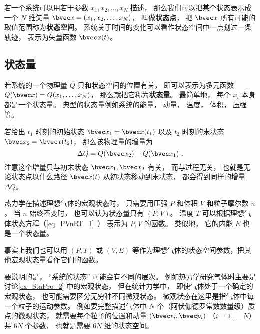 

若一个系统可以用若干参数 $x_1, x_2,  \dots, x_N$ 描述， 那么我们可以把某个状态表示成一个 $N$ 维矢量 $\bvec x = (x_1, x_2, \dots, x_N)$， 叫做\textbf{状态点}， 把 $\bvec x$ 所有可能的取值范围称为\textbf{状态空间}。 系统关于时间的变化可以看作状态空间中一点划过一条轨迹， 表示为矢量函数 $\bvec x(t)$。

\subsection{状态量}
若系统的一个物理量 $Q$ 只和状态空间的位置有关， 即可以表示为多元函数 $Q(\bvec x) = Q(x_1, \dots, x_N)$， 那么就把它称为\textbf{状态量}。 最简单地， 每个 $x_i$ 本身都是一个状态量。 典型的状态量例如系统的能量， 动量， 温度， 体积， 压强等。

若给出 $t_1$ 时刻的初始状态 $\bvec x_1 = \bvec x(t_1)$ 以及 $t_2$ 时刻的末状态 $\bvec x_2 = \bvec x(t_2)$， 那么该物理量的增量为
\begin{equation}
\Delta Q = Q(\bvec x_2) - Q(\bvec x_1)~.
\end{equation}
注意这个增量只与初末状态 $\bvec x_1,\bvec x_2$ 有关， 而与过程无关， 也就是无论状态点以什么路径 $\bvec x(t)$ 从初状态移动到末状态， 都会得到同样的增量 $\Delta Q$。

\begin{example}{}\label{ex_StaPro_2}
热力学在描述理想气体的宏观状态时， 只需要用压强 $P$ 和体积 $V$ 和粒子摩尔数 $n$。 当 $n$ 始终不变时， 也可以认为状态量只有 $(P,V)$。 温度 $T$ 可以根据理想气体状态方程（\autoref{eq_PVnRT_1}~） 表示为 $P,V$ 的函数。 类似地， 它的内能 $E$ 也是一个状态量。

事实上我们也可以用 $(P,T)$ 或 $(V,E)$ 等作为理想气体的状态空间参数，把其他宏观状态量看作它们的函数。
\end{example}

要说明的是， “系统的状态” 可能会有不同的层次。 例如热力学研究气体时主要是讨论\autoref{ex_StaPro_2} 中的宏观状态， 但在统计力学中， 即使气体处于一个确定的宏观状态， 也可能需要区分无穷种不同微观状态。 微观状态在这里是指气体中每一个粒子的运动参数。 例如要完整描述气体中 $N$ 个（阿伏伽德罗常数数量级）质点的微观状态， 就需要每个粒子的位置和动量 $(\bvec r_i, \bvec p_i)$ （$i=1,\dots,N$） 共 $6N$ 个参数， 也就是需要 $6N$ 维的状态空间。

